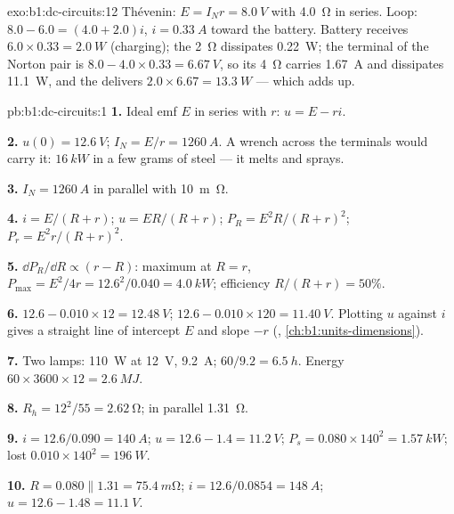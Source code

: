\begin{solution}{exo:b1:dc-circuits:12}
Thévenin: $E = I_N r = \qty{8.0}{V}$ with \qty{4.0}{\ohm} in series.
Loop: $8.0 - 6.0 = (4.0 + 2.0)i$, $i = \qty{0.33}{A}$ toward the battery.
Battery receives $6.0 \times 0.33 = \qty{2.0}{W}$ (charging); the
\qty{2}{\ohm}  dissipates \qty{0.22}{W}; the terminal  of
the Norton pair is $8.0 - 4.0 \times 0.33 = \qty{6.67}{V}$, so its
\qty{4}{\ohm} carries \qty{1.67}{A} and dissipates \qty{11.1}{W}, and the
 delivers $2.0 \times 6.67 = \qty{13.3}{W}$ --- which adds
up.
\end{solution}

\begin{solution}{pb:b1:dc-circuits:1}
\textbf{1.} Ideal emf $E$ in series with $r$: $u = E - ri$.

\textbf{2.} $u(0) = \qty{12.6}{V}$; $I_N = E/r = \qty{1260}{A}$. A wrench
across the terminals would carry it: $\qty{16}{kW}$ in a few grams of
steel --- it melts and sprays.

\textbf{3.}  $I_N = \qty{1260}{A}$ in parallel with
\qty{10}{m\ohm}.

\textbf{4.} $i = E/(R + r)$; $u = ER/(R + r)$; $P_R = E^2R/(R + r)^2$;
$P_r = E^2r/(R + r)^2$.

\textbf{5.} $\dd P_R/\dd R \propto (r - R)$: maximum at $R = r$,
$P_{\max} = E^2/4r = 12.6^2/0.040 = \qty{4.0}{kW}$; efficiency
$R/(R + r) = 50\%$.

\textbf{6.} $12.6 - 0.010 \times 12 = \qty{12.48}{V}$; $12.6 - 0.010 \times
120 = \qty{11.40}{V}$. Plotting $u$ against $i$ gives a straight line of
intercept $E$ and slope $-r$ (, \cref{ch:b1:units-dimensions}).

\textbf{7.} Two lamps: \qty{110}{W} at \qty{12}{V}, \qty{9.2}{A};
$60/9.2 = \qty{6.5}{h}$. Energy $60 \times 3600 \times 12 = \qty{2.6}{MJ}$.

\textbf{8.} $R_h = 12^2/55 = \qty{2.62}{\ohm}$; in parallel \qty{1.31}{\ohm}.

\textbf{9.} $i = 12.6/0.090 = \qty{140}{A}$; $u = 12.6 - 1.4 = \qty{11.2}{V}$;
$P_s = 0.080 \times 140^2 = \qty{1.57}{kW}$; lost $0.010 \times 140^2 =
\qty{196}{W}$.

\textbf{10.} $R = 0.080 \parallel 1.31 = \qty{75.4}{m\ohm}$; $i = 12.6/0.0854
= \qty{148}{A}$; $u = 12.6 - 1.48 = \qty{11.1}{V}$.


\end{solution}
